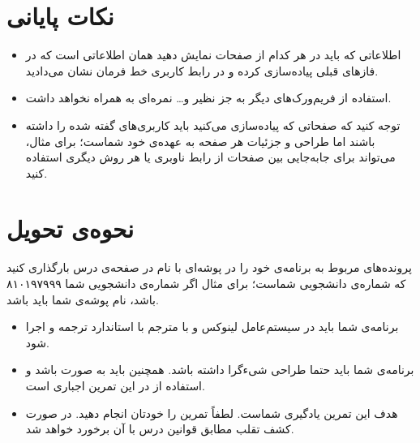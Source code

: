 \documentclass{utap}
\begin{document}
 
 
 
	\section{نکات پایانی}
		\begin{itemize}
			\item  اطلاعاتی که باید در هر کدام از صفحات نمایش دهید همان اطلاعاتی است که در فاز‌های قبلی پیاده‌سازی کرده‌ و در رابط کاربری خط فرمان نشان می‌دادید. 
			\item  
			استفاده از فریم‌ورک‌های دیگر به جز
				نظیر 
				و\dots{} نمره‌ای به همراه نخواهد داشت.
				
			\item 
			توجه کنید که صفحاتی که پیادەسازی می‌کنید باید کاربری‌های گفته شده را داشته باشند اما طراحی و جزئیات هر صفحه به عهدەی خود شماست؛ برای مثال، می‌تواند برای جابه‌جایی بین صفحات از رابط ناوبری
			یا هر روش دیگری استفاده کنید. 
		\end{itemize}

	\section{نحوه‌ی تحویل}
		پرونده‌‌های مربوط به برنامه‌ی خود را در پوشه‌ای با نام  در صفحه‌ی  درس بارگذاری کنید که  شماره‌ی دانشجویی شماست؛ برای مثال اگر شماره‌ی دانشجویی شما ۸۱۰۱۹۷۹۹۹ باشد، نام پوشه‌ی شما باید  باشد.
		\begin{itemize}
			\item
						برنامه‌ی شما باید در سیستم‌عامل لینوکس و با مترجم  با استاندارد  ترجمه و اجرا شود.
					\item
						برنامه‌ی شما باید حتما طراحی شیءگرا داشته باشد. همچنین باید به صورت  باشد و استفاده از  در این تمرین اجباری است.
					\item
						هدف این تمرین یادگیری شماست. لطفاً تمرین را خودتان انجام دهید. در صورت کشف تقلب مطابق قوانین درس با آن برخورد خواهد شد.
		\end{itemize}
\end{document}
